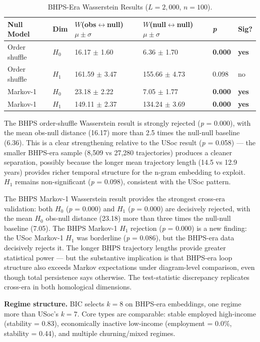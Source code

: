 \begin{table}[htbp]
\centering
\caption{BHPS-Era Wasserstein Results ($L = 2{,}000$, $n = 100$).}
\label{tab:bhps-wasserstein}
\small
\begin{tabular}{llllll}
\toprule
Null Model & Dim & $W$(obs$\leftrightarrow$null) $\mu{\pm}\sigma$ & $W$(null$\leftrightarrow$null) $\mu{\pm}\sigma$ & \textit{p} & Sig? \\
\midrule
Order shuffle & $H_0$ & 16.17 $\pm$ 1.60 & 6.36 $\pm$ 1.70 & \textbf{0.000} & \textbf{yes} \\
Order shuffle & $H_1$ & 161.59 $\pm$ 3.47 & 155.66 $\pm$ 4.73 & 0.098 & no \\
Markov-1 & $H_0$ & 23.18 $\pm$ 2.22 & 7.05 $\pm$ 1.77 & \textbf{0.000} & \textbf{yes} \\
Markov-1 & $H_1$ & 149.11 $\pm$ 2.37 & 134.24 $\pm$ 3.69 & \textbf{0.000} & \textbf{yes} \\
\bottomrule
\end{tabular}
\end{table}

The BHPS order-shuffle Wasserstein result is strongly rejected (\textit{p} = 0.000), with the mean obs-null distance (16.17) more than 2.5 times the null-null baseline (6.36). This is a clear strengthening relative to the USoc result (\textit{p} = 0.058) --- the smaller BHPS-era sample (8,509 vs 27,280 trajectories) produces a cleaner separation, possibly because the longer mean trajectory length (14.5 vs 12.9 years) provides richer temporal structure for the n-gram embedding to exploit. $H_1$ remains non-significant (\textit{p} = 0.098), consistent with the USoc pattern.

The BHPS Markov-1 Wasserstein result provides the strongest cross-era validation: both $H_0$ (\textit{p} = 0.000) and $H_1$ (\textit{p} = 0.000) are decisively rejected, with the mean $H_0$ obs-null distance (23.18) more than three times the null-null baseline (7.05). The BHPS Markov-1 $H_1$ rejection (\textit{p} = 0.000) is a new finding: the USoc Markov-1 $H_1$ was borderline (\textit{p} = 0.086), but the BHPS-era data decisively rejects it. The longer BHPS trajectory lengths provide greater statistical power --- but the substantive implication is that BHPS-era loop structure also exceeds Markov expectations under diagram-level comparison, even though total persistence says otherwise. The test-statistic discrepancy replicates cross-era in both homological dimensions.

\textbf{Regime structure.} BIC selects $k = 8$ on BHPS-era embeddings, one regime more than USoc's $k = 7$. Core types are comparable: stable employed high-income (stability = 0.83), economically inactive low-income (employment = 0.0\%, stability = 0.44), and multiple churning/mixed regimes.

